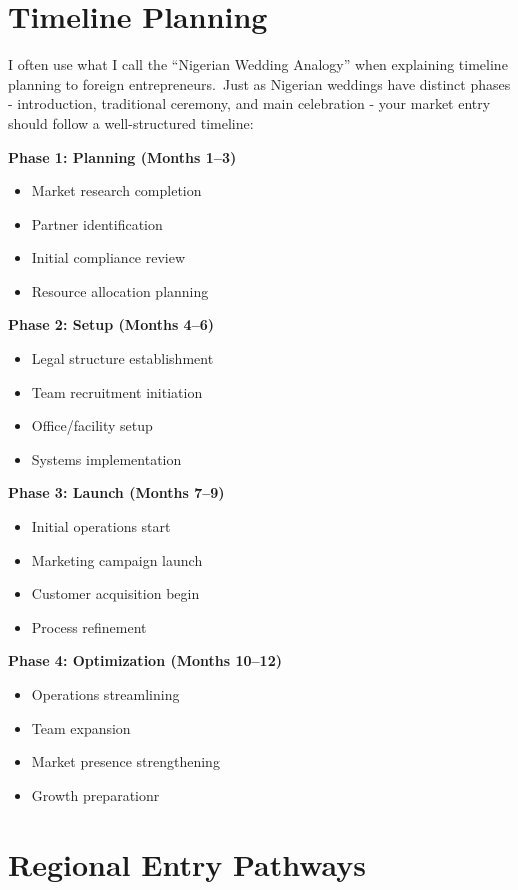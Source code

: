 \section{Timeline Planning}\label{sec:timeline-planning}

I often use what I call the ``Nigerian Wedding Analogy'' when explaining timeline planning to foreign entrepreneurs.\ Just as Nigerian weddings have distinct phases - introduction, traditional ceremony, and main celebration - your market entry should follow a well-structured timeline:

\textbf{Phase 1: Planning (Months 1--3)}
\begin{itemize}
    \item Market research completion
    \item Partner identification
    \item Initial compliance review
    \item Resource allocation planning
\end{itemize}
\vspace{1em}
\textbf{Phase 2: Setup (Months 4--6)}
\begin{itemize}
    \item Legal structure establishment
    \item Team recruitment initiation
    \item Office/facility setup
    \item Systems implementation
\end{itemize}
\vspace{1em}
\textbf{Phase 3: Launch (Months 7--9)}
\begin{itemize}
    \item Initial operations start
    \item Marketing campaign launch
    \item Customer acquisition begin
    \item Process refinement
\end{itemize}
\vspace{1em}
\textbf{Phase 4: Optimization (Months 10--12)}
\begin{itemize}
    \item Operations streamlining
    \item Team expansion
    \item Market presence strengthening
    \item Growth preparationr
\end{itemize}


\section{Regional Entry Pathways}\label{sec:regional-entry-pathways}

